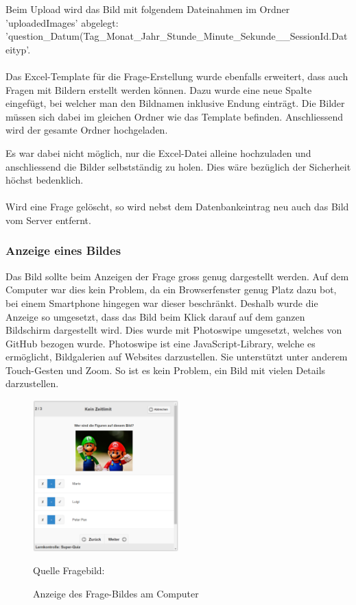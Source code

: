 Beim Upload wird das Bild mit folgendem Dateinahmen im Ordner 'uploadedImages' abgelegt: 'question\_Datum(Tag\_Monat\_Jahr\_Stunde\_Minute\_Sekunde\_\_SessionId.Dateityp'.
\\
\\
Das Excel-Template für die Frage-Erstellung wurde ebenfalls erweitert, dass auch Fragen mit Bildern erstellt werden können. Dazu wurde eine neue Spalte eingefügt, bei welcher man den Bildnamen inklusive Endung einträgt. Die Bilder müssen sich dabei im gleichen Ordner wie das Template befinden. Anschliessend wird der gesamte Ordner hochgeladen.

Es war dabei nicht möglich, nur die Excel-Datei alleine hochzuladen und anschliessend die Bilder selbstständig zu holen. Dies wäre bezüglich der Sicherheit höchst bedenklich.
\\
\\
Wird eine Frage gelöscht, so wird nebst dem Datenbankeintrag neu auch das Bild vom Server entfernt.


\subsubsection{Anzeige eines Bildes}
Das Bild sollte beim Anzeigen der Frage gross genug dargestellt werden. Auf dem Computer war dies kein Problem, da ein Browserfenster genug Platz dazu bot, bei einem Smartphone hingegen war dieser beschränkt. Deshalb wurde die Anzeige so umgesetzt, dass das Bild beim Klick darauf auf dem ganzen Bildschirm dargestellt wird. Dies wurde mit Photoswipe \cite{photoswipe} umgesetzt, welches von GitHub \cite{github_photoswipe} bezogen wurde. Photoswipe ist eine JavaScript-Library, welche es ermöglicht, Bildgalerien auf Websites darzustellen. Sie unterstützt unter anderem Touch-Gesten und Zoom. So ist es kein Problem, ein Bild mit vielen Details darzustellen.

\begin{figure}
	\centering
	\includegraphics[width=0.5\textwidth]{Images/Frage-Bild_Anzeige_PC.PNG}
	\caption{Anzeige des Frage-Bildes am Computer}
	Quelle Fragebild: \cite{_bild_pixabay_mario_}
\end{figure}

